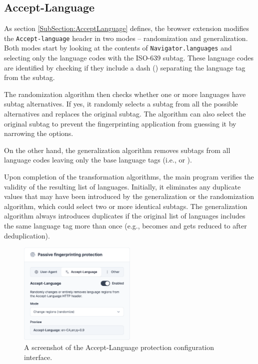 \subsection{Accept-Language}

As section \ref{SubSection:AcceptLanguage} defines, the browser extension modifies the \texttt{Accept-language} header in two modes -- randomization and generalization. Both modes start by looking at the contents of \texttt{Navigator.languages} and selecting only the language codes with the ISO-639 subtag. These language codes are identified by checking if they include a dash (\uv{-}) separating the language tag from the subtag.

The randomization algorithm then checks whether one or more languages have subtag alternatives. If yes, it randomly selects a subtag from all the possible alternatives and replaces the original subtag. The algorithm can also select the original subtag to prevent the fingerprinting application from guessing it by narrowing the options.

On the other hand, the generalization algorithm removes subtags from all language codes leaving only the base language tags (i.e.,  or ).

Upon completion of the transformation algorithms, the main program verifies the validity of the resulting list of languages. Initially, it eliminates any duplicate values that may have been introduced by the generalization or the randomization algorithm, which could select two or more identical subtags. The generalization algorithm always introduces duplicates if the original list of languages includes the same language tag more than once (e.g.,  becomes  and gets reduced to  after deduplication).

\begin{figure}[H]
    \centering
    \includegraphics[width=0.5\textwidth]{obrazky-figures/screenshot-accept-language}
    \caption{A screenshot of the Accept-Language protection configuration interface.}
\end{figure}

